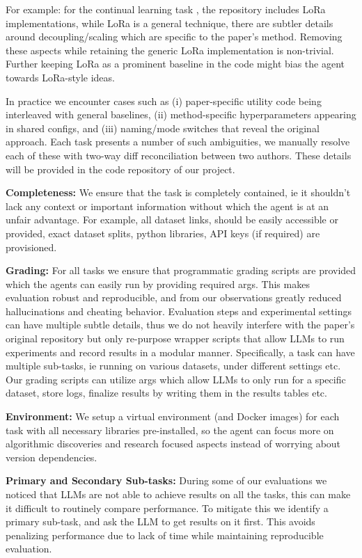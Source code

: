 \documentclass[11pt]{article}
\let\cite\citep
\theoremstyle{plain}
\theoremstyle{definition}
\theoremstyle{remark}
\begin{document}
For example: for the continual learning task \cite{wu2025sdlora}, the repository includes LoRa implementations, while LoRa is a general technique, there are subtler details around decoupling/scaling which are specific to the paper's method. Removing these aspects while retaining the generic LoRa implementation is non-trivial. Further keeping LoRa as a prominent baseline in the code might bias the agent towards LoRa-style ideas.

In practice we encounter cases such as (i) paper-specific utility code being interleaved with general baselines, (ii) method-specific hyperparameters appearing in shared configs, and (iii) naming/mode switches that reveal the original approach. Each task presents a number of such ambiguities, we manually resolve each of these with two-way diff reconciliation between two authors. These details will be provided in the code repository of our project.

\textbf{Completeness:} We ensure that the task is completely contained, ie it shouldn't lack any context or important information without which the agent is at an unfair advantage. For example, all dataset links, should be easily accessible or provided, exact dataset splits, python libraries, API keys (if required) are provisioned.

\textbf{Grading:} For all tasks we ensure that programmatic grading scripts are provided which the agents can easily run by providing required args. This makes evaluation robust and reproducible, and from our observations greatly reduced hallucinations and cheating behavior. Evaluation steps and experimental settings can have multiple subtle details, thus we do not heavily interfere with the paper's original repository but only re-purpose wrapper scripts that allow LLMs to run experiments and record results in a modular manner. Specifically, a task can have multiple sub-tasks, ie running on various datasets, under different settings etc. Our grading scripts can utilize args which allow LLMs to only run for a specific dataset, store logs, finalize results by writing them in the results tables etc.

\textbf{Environment:} We setup a virtual environment (and Docker images) for each task with all necessary libraries pre-installed, so the agent can focus more on algorithmic discoveries and research focused aspects instead of worrying about version dependencies.

\textbf{Primary and Secondary Sub-tasks:} During some of our evaluations we noticed that LLMs are not able to achieve results on all the tasks, this can make it difficult to routinely compare performance. To mitigate this we identify a primary sub-task, and ask the LLM to get results on it first. This avoids penalizing performance due to lack of time while maintaining reproducible evaluation.
\end{document}

